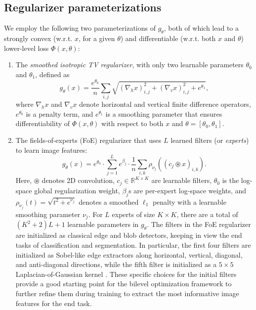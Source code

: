 \subsection{Regularizer parameterizations}
We employ the following two parameterizations of $g_{\theta}$, both of which lead to a strongly convex (w.r.t. $x$, for a given $\theta$) and differentiable (w.r.t. both $x$ and $\theta$) lower-level loss $\Phi(x,\theta)$: 
\begin{enumerate}[leftmargin=*,nosep]
    \item The \textit{smoothed isotropic TV regularizer}, with only two learnable parameters $\theta_0$ and $\theta_1$, defined as
\begin{equation}
\textstyle
    g_\theta(x) = \frac{e^{\theta_0}}{n} \sum_{i,j} \sqrt{(\nabla_h x)_{i,j}^2 + (\nabla_v x)_{i,j}^2 + e^{\theta_1}},
\end{equation}
where $\nabla_h x$ and $\nabla_v x$ denote horizontal and vertical finite difference operators, $e^{\theta_0}$ is a penalty term, and $e^{\theta_1}$ is a smoothing parameter that ensures differentiability of $\Phi(x,\theta)$ with respect to both $x$ and $\theta=[\theta_0,\theta_1]$. 
\item The fields-of-experts (FoE) regularizer \cite{Yunjin_Chen_2014,Crockett_2022} that uses $L$ learned filters (or \textit{experts}) to learn image features:
\begin{equation}
\textstyle
    g_\theta(x) = e^{\theta_0} \cdot \sum_{j=1}^{L} e^{\beta_j} \cdot \frac{1}{n}\sum_{i,k} \rho_{\nu_j}\left((c_j \circledast x)_{i,k}\right).
\end{equation}
Here, $\circledast$ denotes 2D convolution, $c_j \in \mathbb{R}^{K \times K}$ are learnable filters, $\theta_0$ is the log-space global regularization weight, $\beta_j$s are per-expert log-space weights, and $\rho_{\nu_j}(t) = \sqrt{t^2 + e^{\nu_j}}$ denotes a smoothed $\ell_1$ penalty with a learnable smoothing parameter $\nu_j$. For $L$ experts of size $K\times K$, there are a total of $(K^2+2)L+1$ learnable parameters in $g_{\theta}$. The filters in the FoE regularizer are initialized as classical edge and blob detectors, keeping in view the end tasks of classification and segmentation. In particular, the first four filters are initialized as Sobel-like edge extractors along horizontal, vertical, diagonal, and anti-diagonal directions, while the fifth filter is initialized as a $5\times 5$ Laplacian-of-Gaussian kernel \cite{marr1980theory}. These specific choices for the initial filters provide a good starting point for the bilevel optimization framework to further refine them during training to extract the most informative image features for the end task.  


\end{enumerate}
